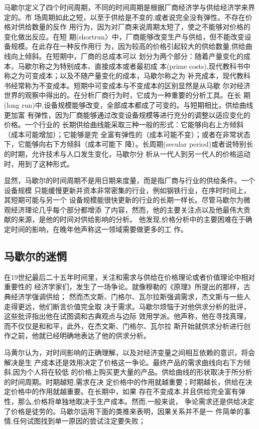 马歇尔定义了四个时间周期，不同的时间周期是根据厂商经济学与供给经济学来界定的。市
场周期如此之短，以至于供给是不变的,或者说完全没有弹性。不存在价格对供给数量的反作
用行为，因为对厂商来说周期太短了，使之不能够对价格的变化做出反应。在短
期(shortrun〉中，厂商能够改变生产与供给，但不能改变设备规模。在此存在一种反作用行
为，因为较高的价格引起较大的供给数量,供给曲线向上倾斜。在短期中，厂商的总成本可以
划分为两个部分：随着产量变化的成本，马歇尔称之为特别成本、直接成本或者最初成
本(prime costs),现代教科书中称之为可变成本；以及不随产量变化的成本，马歇尔称之为
补充成本，现代教科书经常称为不变成本。短期中可变成本与不变成本的区别显然是从马歇
尔对经济世界的观察中得出的。在分析厂商行为时，它成为一种重要的分析工具。在长
期(long run)中,设备规模能够改变，全部成本都成了可变的。与短期相比，供给曲线更加富
有弹性，因为厂商能够通过改变设备规模等进行充分的调整以适应变化的价格。一个行业的
长期供给曲线能采取三种一般的形式：它能够向右上方倾斜（成本可能增加）；它能够是完
全富有弹性的（成本可能不变）；或者在非常状态下，它能够向右下方倾斜（成本可能下
降）。长周期(secular period)或者说特别长的时期，允许技术与人口发生变化，马歇尔分
析从一代人到另一代人的价格运动时，用到了这种形式。

显然，马歇尔的时间周期不是用日期来度量，而是指厂商与行业的供给条件。一个设备规模
只能缓慢更新并资本非常密集的行业，例如钢铁行业，在序时时间上，其短期可能与另一个
设备规模能很快更新的行业的长期一样长。尽管马歇尔为微观经济理论几乎每个部分都增添
了内容，然而，他的主要关注点以及他最伟大贡献的来源，是他的时间对供给影响的分析。
他发现,价格分析中的主要困难在于确定时间的影响，在晚年他声称这一领域需要做更多的工
作。

\subsection{马歇尔的迷惘}

在19世纪最后二十五年时间里，关注和需求与供给在价格理论或者价值理论中相对重要性的
经济学家们，发生了一场争论。就像穆勒的《原理》所提出的那样，古典经济学强调供给；
然而杰文斯、门格尔、瓦尔拉斯强调需求，杰文斯与一些人走得更远，他们断言价值完全取
决于需求。马歇尔烦恼于对他供求分析的批评，这些批评指出他在试图调和古典观点与边际
效用学派。他声称，他在寻找真理，而不仅仅是和和平，此外，在杰文斯、门格尔、瓦尔拉
斯开始就供求分析进行创作之前，他就已经明确地表达了他的供求分析。

马黄尔认为，对时间影响的正确理解，以及对经济变量之间相互依赖的意识，将会解决是生
产成本还是效用决定了价格这一争论。最终产品的需求曲线向右下方倾斜,因为个人将在较低
的价格上购买更大量的产品。供给曲线的形状取决于所分析的时间周期。时期越短,需求在决
定价格中的作用就越重要；时期越长，供给在决定价格中的作用就越重要。在长期中，如果
存在不变成本,并且供给完全富有弹性，那么,价格将单独地取决于生产成本。然而,一般来说，
争论需求还是供给决定了价格是徒劳的。马歇尔运用下面的类推来表明，因果关系并不是一
件简单的事情,任何试图找到单一原因的尝试注定要失败；

